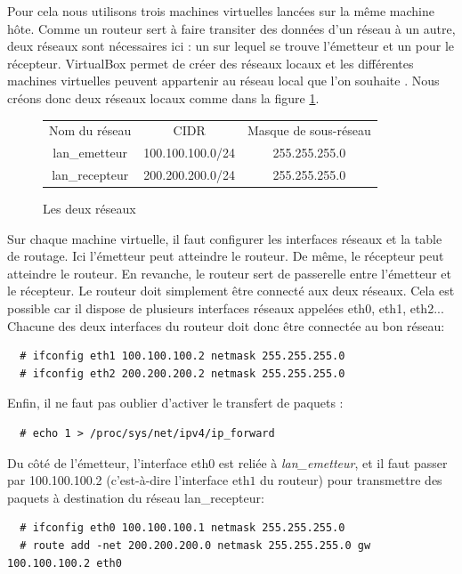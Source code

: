 \documentclass[a4paper]{article}
\begin{document}
Pour cela nous utilisons trois machines virtuelles lancées sur la même machine hôte. 
Comme un routeur sert à faire transiter des données d'un réseau à un autre, deux
réseaux sont nécessaires ici : un sur lequel se trouve l'émetteur et un pour le récepteur.
VirtualBox permet de créer des réseaux locaux et les différentes machines virtuelles
 peuvent appartenir au réseau local que l’on souhaite \cite{virtualbx}. Nous créons donc deux réseaux locaux 
 comme dans la figure \ref{reseaux1}.

\begin{figure}[!ht]
	\centering
	\begin{tabular}{c|c|c}
	Nom du réseau & CIDR & Masque de sous-réseau\\
	lan\_emetteur & 100.100.100.0/24 & 255.255.255.0\\
	lan\_recepteur & 200.200.200.0/24 & 255.255.255.0\\
	\end{tabular}
	\caption{\label{reseaux1} Les deux réseaux}
\end{figure}

Sur chaque machine virtuelle, il faut configurer les interfaces réseaux et la table de routage. 
Ici l'émetteur peut atteindre le routeur. De même, le récepteur peut atteindre le routeur. 
En revanche, le routeur sert de passerelle entre l'émetteur et le récepteur.
Le routeur doit simplement être connecté aux deux réseaux.
Cela est possible car il dispose de plusieurs interfaces réseaux appelées eth0, eth1, eth2...
Chacune des deux interfaces du routeur doit donc être
connectée au bon réseau:
\begin{verbatim}
  # ifconfig eth1 100.100.100.2 netmask 255.255.255.0
  # ifconfig eth2 200.200.200.2 netmask 255.255.255.0
\end{verbatim}

Enfin, il ne faut pas oublier d'activer le transfert de
paquets :
\begin{verbatim}
  # echo 1 > /proc/sys/net/ipv4/ip_forward
\end{verbatim}

Du côté de l'émetteur, l'interface eth$0$ est reliée à
\textit{lan\_emetteur}, et il faut passer par 100.100.100.2
(c'est-à-dire l'interface eth$1$ du routeur) pour transmettre
des paquets à destination du réseau lan\_recepteur:
\begin{verbatim}
  # ifconfig eth0 100.100.100.1 netmask 255.255.255.0
  # route add -net 200.200.200.0 netmask 255.255.255.0 gw 100.100.100.2 eth0
\end{verbatim}
\end{document}
